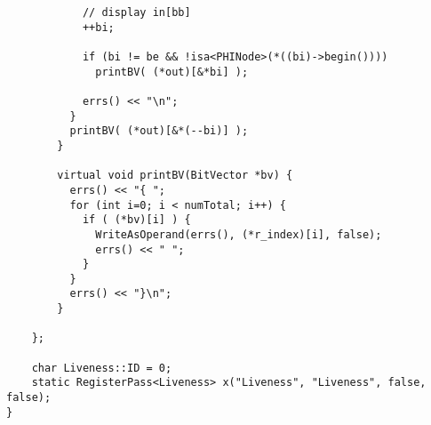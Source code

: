 \documentclass[12pt]{article}
\begin{document}
\begin{verbatim}
            // display in[bb]
            ++bi;
            
            if (bi != be && !isa<PHINode>(*((bi)->begin())))
              printBV( (*out)[&*bi] );

            errs() << "\n";
          }
          printBV( (*out)[&*(--bi)] );
        }
        
        virtual void printBV(BitVector *bv) {
          errs() << "{ ";
          for (int i=0; i < numTotal; i++) {
            if ( (*bv)[i] ) {
              WriteAsOperand(errs(), (*r_index)[i], false);
              errs() << " ";
            }
          }
          errs() << "}\n";
        }
    
    };

    char Liveness::ID = 0;
    static RegisterPass<Liveness> x("Liveness", "Liveness", false, false);
}

\end{verbatim}
\end{document}
